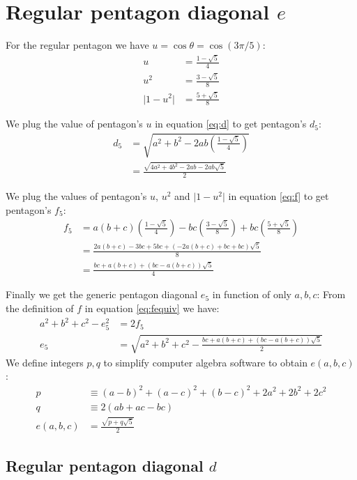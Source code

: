 \documentclass[11pt]{article}
\begin{document}
\section{Regular pentagon diagonal $e$}

For the regular pentagon we have $u = \cos\theta = \cos(3\pi/5)$:
\begin{align}
u &= \frac{1-\sqrt{5}}{4}\\
u^2 &= \frac{3-\sqrt{5}}{8}\\
\lvert 1-u^2 \rvert &= \frac{5+\sqrt5}{8}
\end{align}

We plug the value of pentagon's $u$ in equation \ref{eq:d}
to get pentagon's $d_5$:
\begin{align}
d_5 &= \sqrt{a^2 + b^2 - 2ab\left(\frac{1-\sqrt{5}}{4}\right)} \nonumber\\
 &= \frac{\sqrt{4a^2 + 4b^2 - 2ab - 2ab\sqrt5}}{2} \label{eq:d5}
\end{align}

We plug the values of pentagon's $u$, $u^2$ and $\lvert 1-u^2 \rvert$ in equation \ref{eq:f}
to get pentagon's $f_5$:
\begin{align}
f_5 &= a\left(b+c\right)\left(\frac{1-\sqrt5}4\right)
 - bc\left(\frac{3-\sqrt5}8\right)
 + bc\left(\frac{5+\sqrt5}8\right)\nonumber\\
 &= \frac{2a(b+c) - 3bc + 5bc + (-2a(b+c) +bc + bc)\sqrt5}8\nonumber\\
 &= \frac{bc + a(b+c) + (bc - a(b+c))\sqrt5}4 \label{eq:f5}
\end{align}

Finally we get the generic pentagon diagonal $e_5$ in function of only $a,b,c$:
From the definition of $f$ in equation \ref{eq:fequiv} we have:
\begin{align}
a^2 + b^2 + c^2 - e^2_5 &= 2f_5 \nonumber\\
e_5 &= \sqrt{a^2 + b^2 + c^2 - \frac{bc + a(b+c) + (bc - a(b+c))\sqrt5}2} \label{eq:e5}
\end{align}
We define integers $p,q$ to simplify computer algebra software to obtain $e(a,b,c)$:
\begin{align}
p &\equiv (a-b)^2 + (a-c)^2 + (b-c)^2 + 2a^2 + 2b^2 + 2c^2 \\
q &\equiv 2(ab + ac - bc) \\
e(a,b,c) &= \frac{\sqrt{p + q\sqrt5}}2
\end{align}

\subsection {Regular pentagon diagonal $d$}
\end{document}
